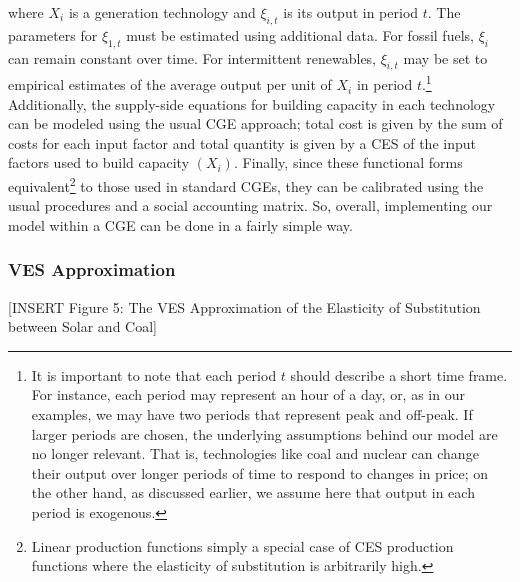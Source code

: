\documentclass[11pt,a4paper,leqno]{extarticle}
\begin{document}
	where $X_i$ is a generation technology and $\xi_{i,t}$ is its output in period $t$. The parameters for $\xi_{1,t}$ must be estimated using additional data. For fossil fuels, $\xi_i$ can remain constant over time. For intermittent renewables, $\xi_{i,t}$ may be set to empirical estimates of the average output per unit of $X_i$ in period $t$.\footnote{ It is important to note that each period $t$ should describe a short time frame. For instance, each period may represent an hour of a day, or, as in our examples, we may have two periods that represent peak and off-peak. If larger periods are chosen, the underlying assumptions behind our model are no longer relevant. That is, technologies like coal and nuclear can change their output over longer periods of time to respond to changes in price; on the other hand, as discussed earlier, we assume here that output in each period is exogenous.}  Additionally, the supply-side equations for building capacity in each technology can be modeled using the usual  CGE approach; total cost is given by the sum of costs for each input factor and total quantity is given by a CES of the input factors used to build capacity $(X_i)$. Finally, since these functional forms equivalent\footnote{ Linear production functions simply a special case of CES production functions where the elasticity of substitution is arbitrarily high.} to those used in standard CGEs, they can be calibrated using the usual procedures and a social accounting matrix. So, overall, implementing our model within a CGE can be done in a fairly simple way. 
	
	\subsubsection{VES Approximation}
	
	
	\vspace{0.15in}
	\begin{center}
		[INSERT Figure 5: The VES Approximation of the Elasticity of Substitution between Solar and Coal]
	\end{center}
	\vspace{0.15in}
	
\end{document}
